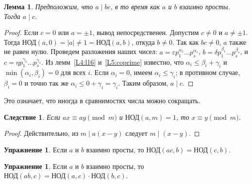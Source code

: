 \documentclass[12pt,notitlepage]{article}
\theoremstyle{plain}
\newtheorem{lemma}[thm]{Лемма}
\newtheorem{corr}[thm]{Следствие}
\theoremstyle{definition}
\newtheorem{exc}[thm]{Упражнение}
\theoremstyle{plain}
\newcommand{\eps}{\varepsilon}
\newcommand{\1}{\mathbf{1}}
\newcommand{\0}{\mathbf{0}}
\newcommand{\dvd}{\mathop{\mid}}
\begin{document}

\begin{lemma}\label{L5:l2}
	Предположим, что $a \dvd b c$, в то время как $a$ и $b$ взаимно просты. Тогда $a \dvd c$.
\end{lemma}
\begin{proof}
	Если $c = 0$ или $a =  \pm 1$, вывод непосредственен. Допустим $c \neq 0$ и $a \neq \pm 1$. Тогда $\text{НОД}(a,0) = |a| \neq 1 = \text{НОД}(a,b)$, откуда $b \neq 0$. Так как $bc \neq 0$, $a$ также не равен нулю. Проведем разложения наших чисел: $a = \eps p^{\alpha_1}_1\ldots p^{\alpha_s}_s$, $b = \delta p^{\beta_1}_1\ldots p^{\beta_s}_s$, и $c = \eta p^{\gamma_1}_1\ldots p^{\gamma_s}_s$. Из лемм~\ref{L4:l16} и~\ref{L5:coprime} известно, что $\alpha_i \leq \beta_i + \gamma_i$ и $\min(\alpha_i, \beta_i) = 0$ для всех $i$. Если $\alpha_i = 0$, имеем $\alpha_i \leq \gamma_i$; в противном случае, $\beta_i = 0$ и точно так же $\alpha_i \leq 0 + \gamma_i = \gamma_i$. Таким образом, $a \dvd c$.
\end{proof}
\noindent Это означает, что иногда в сравнимостях числа можно сокращать.
\begin{corr}\label{L5:c_cancel}
	Если $a x \equiv a y \pmod m$ и $\text{НОД}(a, m) = 1$, то $x \equiv y \pmod m$.
\end{corr}
\begin{proof}
	Действительно, из $m \dvd a(x - y)$ следует $m \dvd (x - y)$.
\end{proof}

\begin{exc}\label{L5:gcd_copirme1}
	Если $a$ и $b$ взаимно просты, то $\text{НОД}(ac, b) = \text{НОД}(c, b)$.
\end{exc}

\begin{exc}\label{L5:gcd_copirme2}
	Если $a$ и $b$ взаимно просты, то $\text{НОД}(ab, c) = \text{НОД}(a,c) \cdot \text{НОД}(b,c)$.
\end{exc}
\end{document}
